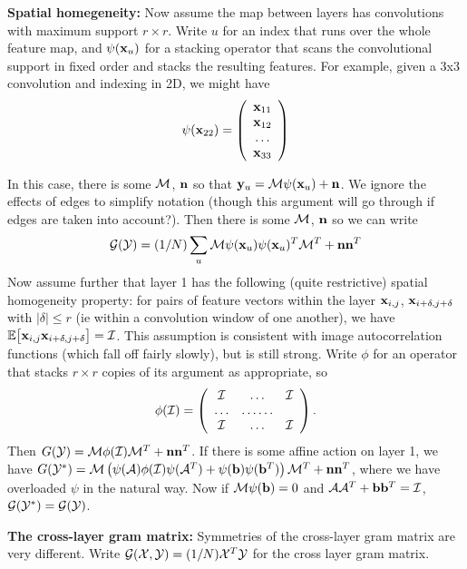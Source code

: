 \documentclass[runningheads]{llncs}
\newcommand{\vect}[1]{{\bf {#1}}}
\newcommand{\matx}[1]{{\cal {#1}}}
\newcommand{\expect}[1]{{\mathbb{E}}{{\left[{{#1}}\right]}}}
\begin{document}
{\bf Spatial homegeneity:} Now assume the map between layers has
convolutions with maximum support $r \times r$.  Write $u$ for an
index that runs over the whole feature map, and $\psi(\vect{x}_u)$ for
a stacking operator that scans the convolutional support in fixed
order and stacks the resulting features. For example, given a 3x3
convolution and indexing in 2D, we might have
\[
\psi(\vect{x}_{22})=\left(\begin{array}{c}\vect{x}_{11}\\
\vect{x}_{12}\\
\ldots\\
\vect{x}_{33}
\end{array}\right)
\]

In this case, there is some $\matx{M}$, $\vect{n}$ so that 
$\vect{y}_u=\matx{M}\psi(\vect{x}_u)+\vect{n}$.  We ignore the
effects of edges to simplify notation (though this argument will go
through if edges are taken into account?).  Then there is some
$\matx{M}$, $\vect{n}$ so we can write 
\[
{\cal G}(\matx{Y})=(1/N) \sum_u
\matx{M}\psi(\vect{x}_u)\psi(\vect{x}_u)^T\matx{M}^T+\vect{n}\vect{n}^T
\]
Now assume further that
layer 1 has the following (quite restrictive) spatial homogeneity
property: for pairs of feature vectors within the layer $\vect{x}_{i,j}$, $\vect{x}_{i+\delta,
  j+\delta}$ with $\mid \! \delta\!\mid \leq r$ (ie within a convolution window of one
another), we have $\expect{\vect{x}_{i,j}\vect{x}_{i+\delta,
    j+\delta}}=\matx{I}$.  This assumption is consistent with image
autocorrelation functions (which fall off fairly slowly), but is still
strong. Write $\phi$ for an operator
that stacks $r \times r$ copies of its argument as appropriate, so
\[\phi(\matx{I})=\left(\begin{array}{ccc}
\matx{I}&\ldots&\matx{I}\\
\ldots &\ldots \ldots \\
\matx{I}&\ldots&\matx{I}
\end{array}\right).
\]
Then
$G(\matx{Y})=\matx{M}\phi(\matx{I})\matx{M}^T+\vect{n}\vect{n}^T$.
If there is some affine action on layer 1, we have
$G(\matx{Y}^*)=\matx{M}\left(\psi(\matx{A})\phi(\matx{I})\psi(\matx{A}^T)+\psi(\vect{b})\psi(\vect{b}^T)\right)\matx{M}^T+\vect{n}\vect{n}^T$,
where we have overloaded $\psi$ in the natural way.  Now if
$\matx{M}\psi(\vect{b})=0$ and $\matx{A}\matx{A}^T+\vect{b}\vect{b}^T=\matx{I}$, ${\cal
  G}(\matx{Y}^*)={\cal G}(\matx{Y})$. 



{\bf The cross-layer gram matrix:}  Symmetries of the cross-layer gram matrix are very different.  Write
${\cal G}(\matx{X}, \matx{Y})=(1/N) \matx{X}^T\matx{Y}$ for
the cross layer gram matrix.  
\end{document}
